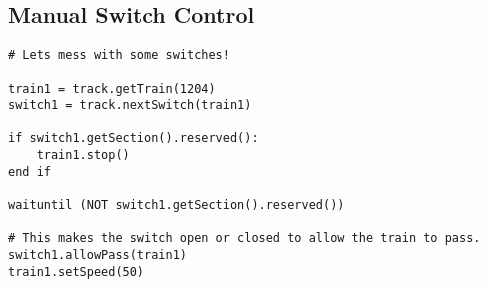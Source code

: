 \documentclass[a4paper,11pt,notitlepage]{article}
\begin{document}
\subsection{Manual Switch Control}
\begin{verbatim}
# Lets mess with some switches!

train1 = track.getTrain(1204)
switch1 = track.nextSwitch(train1)

if switch1.getSection().reserved():
    train1.stop()
end if

waituntil (NOT switch1.getSection().reserved())

# This makes the switch open or closed to allow the train to pass.
switch1.allowPass(train1)
train1.setSpeed(50)
\end{verbatim}
\end{document}
